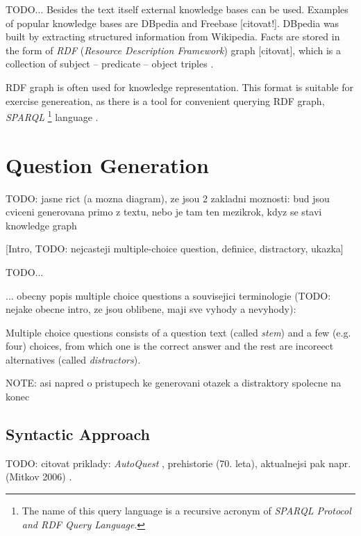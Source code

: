 \documentclass[a4paper, 12pt, twoside]{fithesis2}		%
\renewcommand{\_}{\leavevmode \kern0.0em\vbox{\hrule width0.4em}}
\newcounter{choice}
\begin{document}
TODO...
Besides the text itself external knowledge bases can be used.
Examples of popular knowledge bases are DBpedia \parencite{dbpedia} and Freebase [citovat!].
DBpedia was built by extracting structured information from Wikipedia.
Facts are stored in the form of \textit{RDF} (\textit{Resource Description Framework}) graph [citovat],
which is a collection of subject -- predicate -- object triples \parencite[][63]{semantic-web}.

RDF graph is often used for knowledge representation.
This format is suitable for exercise genereation, as there is a tool for convenient querying RDF graph,
\textit{SPARQL}%
\footnote{The name of this query language is a recursive acronym of \textit{SPARQL Protocol and RDF Query Language}.}
language \parencite[][84]{semantic-web}.



\chapter{Question Generation}
\label{chap:exercises}

TODO: jasne rict (a mozna diagram), ze jsou 2 zakladni moznosti: bud jsou cviceni generovana primo z textu, nebo je tam ten mezikrok, kdyz se stavi knowledge graph

[Intro, TODO: nejcasteji multiple-choice question, definice, distractory, ukazka]

TODO...

... obecny popis multiple choice questions a souvisejici terminologie (TODO: nejake obecne intro, ze jsou oblibene, maji sve vyhody a nevyhody):

Multiple choice questions consists of a question text (called \textit{stem})
and a few (e.g. four) choices, from which one is the correct answer
and the rest are incoreect alternatives (called \textit{distractors}).

NOTE: asi napred o pristupech ke generovani otazek a distraktory spolecne na konec


\section{Syntactic Approach}
\label{sec:questions-syntactically}

TODO: citovat priklady: \textit{AutoQuest} \cite{questions-wolfe}, prehistorie (70. leta), aktualnejsi pak napr. (Mitkov 2006) \cite{question-gen-mitkov}.
\end{document}
